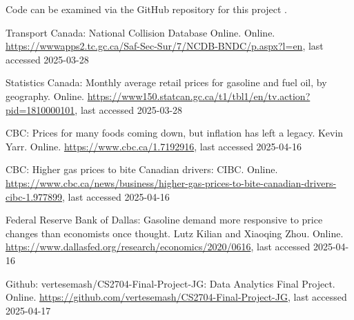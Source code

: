 \documentclass[runningheads]{llncs}
\begin{document}
Code can be examined via the GitHub repository for this project \cite{ref_url3}.
%
%
%
% 
% 
%
\begin{thebibliography}{8}
Transport Canada: National Collision Database Online. Online. \url{https://wwwapps2.tc.gc.ca/Saf-Sec-Sur/7/NCDB-BNDC/p.aspx?l=en}, last accessed 2025-03-28

Statistics Canada: Monthly average retail prices for gasoline and fuel oil, by geography. Online. \url{https://www150.statcan.gc.ca/t1/tbl1/en/tv.action?pid=1810000101}, last accessed 2025-03-28

CBC: Prices for many foods coming down, but inflation has left a legacy. Kevin Yarr. Online. \url{https://www.cbc.ca/1.7192916}, last accessed 2025-04-16

CBC: Higher gas prices to bite Canadian drivers: CIBC. Online. \url{https://www.cbc.ca/news/business/higher-gas-prices-to-bite-canadian-drivers-cibc-1.977899}, last accessed 2025-04-16

Federal Reserve Bank of Dallas: Gasoline demand more responsive to price changes than economists once thought. Lutz Kilian and Xiaoqing Zhou. Online. \url{https://www.dallasfed.org/research/economics/2020/0616}, last accessed 2025-04-16

Github: vertesemash/CS2704-Final-Project-JG: Data Analytics Final Project. Online. \url{https://github.com/vertesemash/CS2704-Final-Project-JG}, last accessed 2025-04-17

\end{thebibliography}
\end{document}
